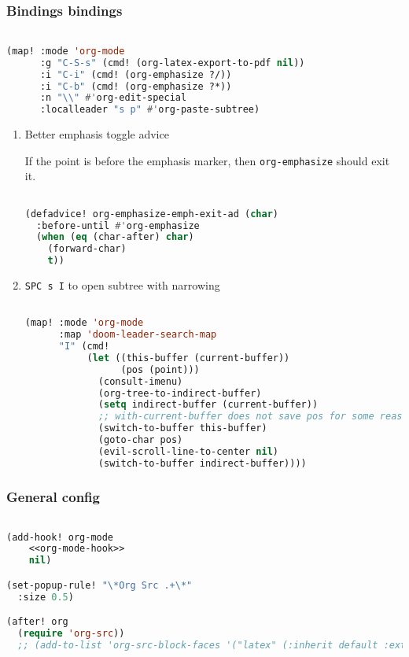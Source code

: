 \documentclass[11pt]{article}
\begin{document}
\subsubsection{Bindings\hfill{} bindings}
\label{sec:bindings}
\begin{lstlisting}[language=Lisp]%! Someone please complete this list for me

(map! :mode 'org-mode
      :g "C-S-s" (cmd! (org-latex-export-to-pdf nil))
      :i "C-i" (cmd! (org-emphasize ?/))
      :i "C-b" (cmd! (org-emphasize ?*))
      :n "\\" #'org-edit-special
      :localleader "s p" #'org-paste-subtree)
\end{lstlisting}

\begin{enumerate}
  \item Better emphasis toggle\hfill{} advice
  \label{sec:better-emphasis-toggle}

  If the point is before the emphasis marker, then \lstinline|org-emphasize| should exit it.

\begin{lstlisting}[language=Lisp]%! Someone please complete this list for me

(defadvice! org-emphasize-emph-exit-ad (char)
  :before-until #'org-emphasize
  (when (eq (char-after) char)
    (forward-char)
    t))
\end{lstlisting}
  \item \texttt{SPC s I} to open subtree with narrowing
  \label{sec:spc-s-i-to-open-subtree-with-narrowing}

  \begin{lstlisting}[language=Lisp]%! Someone please complete this list for me

(map! :mode 'org-mode
      :map 'doom-leader-search-map
      "I" (cmd!
           (let ((this-buffer (current-buffer))
                 (pos (point)))
             (consult-imenu)
             (org-tree-to-indirect-buffer)
             (setq indirect-buffer (current-buffer))
             ;; with-current-buffer does not save pos for some reason
             (switch-to-buffer this-buffer)
             (goto-char pos)
             (evil-scroll-line-to-center nil)
             (switch-to-buffer indirect-buffer))))
\end{lstlisting}
\end{enumerate}

\subsubsection{General config}
\label{sec:general-config}
\begin{lstlisting}[language=Lisp]%! Someone please complete this list for me

(add-hook! org-mode
    <<org-mode-hook>>
    nil)

(set-popup-rule! "\*Org Src .+\*"
  :size 0.5)

(after! org
  (require 'org-src))
  ;; (add-to-list 'org-src-block-faces '("latex" (:inherit default :extend t)))
\end{lstlisting}
\end{document}
